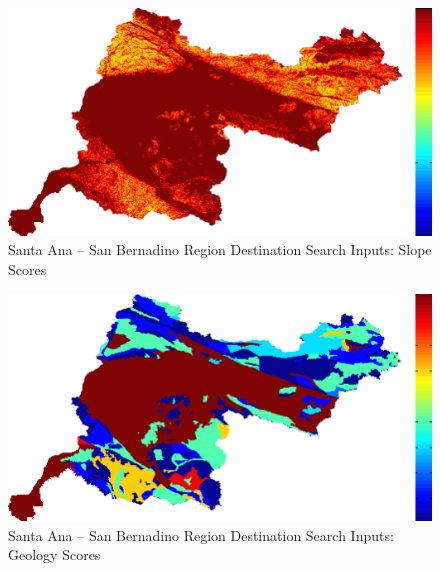         \begin{figure}[!h]
            \begin{center}
            \includegraphics[width=5.5in]{figures/SanBernadino_Search_Slope.png}   
            \caption{Santa Ana -- San Bernadino Region Destination Search Inputs: Slope Scores}
            \label{fig:SASBdsinputs_slope}
            \end{center}
        \end{figure}
        
        \begin{figure}[!h]
            \begin{center}
            \includegraphics[width=5.5in]{figures/SanBernadino_Search_Geology.png}   
            \caption{Santa Ana -- San Bernadino Region Destination Search Inputs: Geology Scores}
            \label{fig:SASBdsinputs_geology}
            \end{center}
        \end{figure}
    
